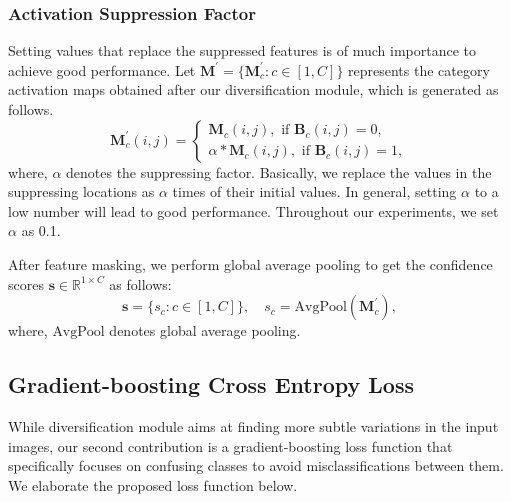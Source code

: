 \documentclass[letterpaper]{article} \usepackage{aaai20}  \usepackage{times}  \usepackage{helvet} \usepackage{courier}  \usepackage[hyphens]{url}  \usepackage{graphicx} \usepackage{multirow}
\begin{document}
\subsubsection{Activation Suppression Factor}\label{sup_values}
Setting values that replace the suppressed features is of much importance to achieve good performance. Let $\mathbf{M}^{'}=\{\mathbf{M}^{'}_c : c\in [1,C]\}$ represents the category activation maps obtained after our diversification module, which is generated as follows.
\begin{equation}
    \mathbf{M}^{'}_c(i,j)=\begin{cases}
    \mathbf{M}_c(i,j), \text{ if $\mathbf{B}_c(i,j)=0$},
    \\
    \alpha* \mathbf{M}_c(i,j), \text{ if $\mathbf{B}_c(i,j)=1$},
    \end{cases}
\end{equation}
where, $\alpha$ denotes the suppressing factor. Basically, we replace the values in the suppressing locations as $\alpha$ times of their initial values. In general, setting $\alpha$ to a low number will lead to good performance. Throughout our experiments, we set $\alpha$ as 0.1.

After feature masking, we perform global average pooling to get the confidence scores $\mathbf{s} \in \mathbb{R}^{1\times C}$  as follows:
\begin{equation}
 \mathbf{s} =\{s_c : c\in [1,C]\},\quad s_c=\text{AvgPool}(\mathbf{M}^{'}_c),
\end{equation}
where, $\text{AvgPool}$ denotes global average pooling.

\subsection{Gradient-boosting Cross Entropy Loss}\label{selected_loss}
While diversification module aims at finding more subtle variations in the input images, our second contribution is  a gradient-boosting loss function that specifically focuses on confusing classes to avoid misclassifications between them. We elaborate the proposed loss function below. 
\end{document}
